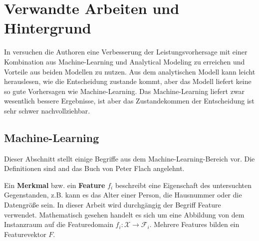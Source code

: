 
\section{Verwandte Arbeiten und Hintergrund}
In \cite{Didona:2015:EPP:2668930.2688047} versuchen die Authoren eine Verbesserung der Leistungsvorhersage mit einer Kombination aus Machine-Learning und Analytical Modeling zu erreichen und Vorteile aus beiden Modellen zu nutzen. Aus dem analytischen Modell kann leicht herauslesen, wie die Entscheidung zustande kommt, aber das Modell liefert keine so gute Vorhersagen wie Machine-Learning. Das Machine-Learning liefert zwar wesentlich bessere Ergebnisse, ist aber das Zustandekommen der Entscheidung ist sehr schwer nachvollziehbar. 
	
\subsection{Machine-Learning}
Dieser Abschnitt stellt einige Begriffe aus dem Machine-Learning-Bereich vor. Die Definitionen sind and das Buch von Peter Flach \cite{Flach:2012:MLA:2490546} angelehnt.

Ein \textbf{Merkmal} bzw. ein \textbf{Feature} $f_i$ beschreibt eine Eigenschaft des untersuchten Gegenstanden, z.B. kann es das Alter einer Person, die Hausnummer oder die Datengröße sein. In dieser Arbeit wird durchgängig der Begriff Feature verwendet. Mathematisch gesehen handelt es sich um eine Abbildung von dem Instanzraum auf die Featuredomain $f_i : \mathscr{X} \rightarrow \mathscr{F}_i$. Mehrere Features bilden ein Featurevektor $F$. 

